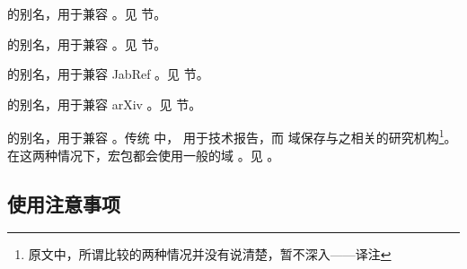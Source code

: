 \begin{fieldlist}

 的别名，用于兼容 \BibTeX 。见  节。




 的别名，用于兼容 \BibTeX 。见  节。




 的别名，用于兼容 JabRef 。见  节。




 的别名，用于兼容 arXiv 。见  节。




 的别名，用于兼容 \BibTeX 。传统 \BibTeX 中， 用于技术报告，而  域保存与之相关的研究机构\footnote{原文中，所谓比较的两种情况并没有说清楚，暂不深入——译注}。
在这两种情况下，\biblatex 宏包都会使用一般的域 。见 。

\end{fieldlist}

\subsection{使用注意事项}
\label{bib:use}

